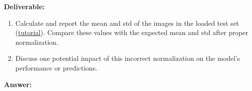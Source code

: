 \documentclass[11pt, oneside]{article}   	%
\begin{document}
\noindent\textbf{Deliverable:}

\begin{enumerate} \item Calculate and report the mean and std of the images in the loaded test set (\href{https://stackoverflow.com/questions/73350133/how-to-calculate-mean-and-standard-deviation-of-a-set-of-images}{tutorial}). Compare these values with the expected mean and std after proper normalization.

\item Discuss one potential impact of this incorrect normalization on the model's performance or predictions. 

\end{enumerate}

\begin{answerbox} \textbf{Answer:} \vspace*{1cm}


\end{answerbox}
\end{document}
